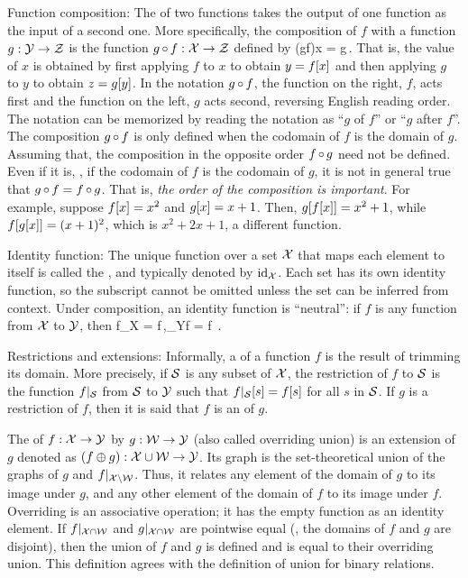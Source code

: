 Function composition: The  of two functions takes the output of one function as the input of a second one. More specifically, the composition of $f$ with a function ${g}:{\mathcal{Y}}\to{\mathcal{Z}}$ is the function ${g\operatorname{\circ} f}:{\mathcal{X}}\to{\mathcal{Z}}$ defined by
\beq
(g\fcomp f)\vat x = g\,.
\eeq
That is, the value of $x$ is obtained by first applying $f$ to $x$ to obtain $y = f\!\left[{x}\right]$ and then applying $g$ to $y$ to obtain $z = g\!\left[{y}\right]$. In the notation $g\operatorname{\circ} f$, the function on the right, $f$, acts first and the function on the left, $g$ acts second, reversing English reading order. The notation can be memorized by reading the notation as ``$g$ of $f$'' or ``$g$ after $f$''. The composition $g\operatorname{\circ} f$ is only defined when the codomain of $f$ is the domain of $g$. Assuming that, the composition in the opposite order $f\operatorname{\circ} g$ need not be defined. Even if it is, \ie, if the codomain of $f$ is the codomain of $g$, it is not in general true that $g\operatorname{\circ} f = f\operatorname{\circ} g$. That is, \emph{the order of the composition is important}. For example, suppose $f\!\left[{x}\right] = x^2$ and $g\!\left[{x}\right] = x+1$. Then, $g\!\left[{f\!\left[{x}\right]}\right] = x^2 + 1$, while $f\!\left[{g\!\left[{x}\right]}\right] = (x+1)^2$, which is $x^2 + 2x + 1$, a different function.

Identity function: The unique function over a set $\mathcal{X}$ that maps each element to itself is called the , and typically denoted by $\text{id}_{\mathcal{X}}$. Each set has its own identity function, so the subscript cannot be omitted unless the set can be inferred from context. Under composition, an identity function is ``neutral'': if $f$ is any function from $\mathcal{X}$ to $\mathcal{Y}$, then
\beq
f\fcomp {}_{\set X} = f\,,\qquad {}_{\set Y}\fcomp f = f \,.
\eeq

Restrictions and extensions: Informally, a  of a function $f$ is the result of trimming its domain. More precisely, if $\mathcal{S}$ is any subset of $\mathcal{X}$, the restriction of $f$ to $\mathcal{S}$ is the function $f|_{\mathcal{S}}$ from $\mathcal{S}$ to $\mathcal{Y}$ such that $f|_{\mathcal{S}}\!\left[{s}\right] = f\!\left[{s}\right]$ for all $s$ in $\mathcal{S}$. If $g$ is a restriction of $f$, then it is said that $f$ is an  of $g$.

The  of ${f}:{\mathcal{X}}\to{\mathcal{Y}}$ by ${g}:{\mathcal{W}}\to{\mathcal{Y}}$ (also called overriding union) is an extension of $g$ denoted as ${(f\oplus g)}:{\mathcal{X}\cup\mathcal{W}}\to{\mathcal{Y}}$. Its graph is the set-theoretical union of the graphs of $g$ and $f|_{\mathcal{X} \setminus \mathcal{W}}$. Thus, it relates any element of the domain of $g$ to its image under $g$, and any other element of the domain of $f$ to its image under $f$. Overriding is an associative operation; it has the empty function as an identity element. If $f|_{\mathcal{X}\cap\mathcal{W}}$ and $g|_{\mathcal{X}\cap\mathcal{W}}$ are pointwise equal (\eg, the domains of $f$ and $g$ are disjoint), then the union of $f$ and $g$ is defined and is equal to their overriding union. This definition agrees with the definition of union for binary relations.

